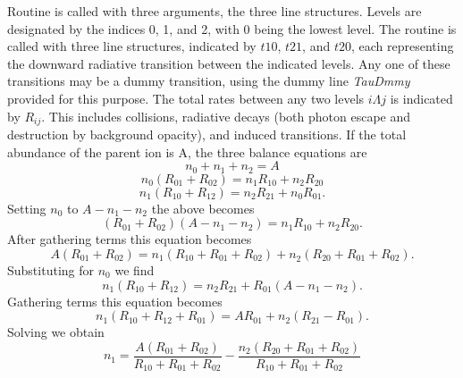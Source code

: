 Routine  is called with three arguments, the three line structures.
Levels are designated by the indices 0, 1, and 2, with 0 being the lowest
level.  The routine is called with three line structures, indicated by $t10$,
$t21$, and $t20$, each representing the downward radiative transition between
the indicated levels.  Any one of these transitions may be a dummy
transition, using the dummy line \emph{TauDmmy} provided for this purpose.  The
total rates between any two levels $i\Lambda j$ is indicated by $R_{ij}$.  This includes
collisions, radiative decays (both photon escape and destruction by
background opacity), and induced transitions.  If the total abundance of
the parent ion is A, the three balance equations are
\begin{equation}
{n_0} + {n_1} + {n_2} = A
\end{equation}
\begin{equation}
{n_0}\left( {{R_{01}} + {R_{02}}} \right) = {n_1}{R_{10}} + {n_2}{R_{20}}
\end{equation}
\begin{equation}
{n_1}\left( {{R_{10}} + {R_{12}}} \right) = {n_2}{R_{21}} + {n_0}{R_{01}}.
\end{equation}
Setting $n_0$ to $A-n_1-n_2$ the above becomes
\begin{equation}
\left( {{R_{01}} + {R_{02}}} \right)\left( {A - {n_1} - {n_2}} \right)
= {n_1}{R_{10}} + {n_2}{R_{20}}.
\end{equation}
After gathering terms this equation becomes
\begin{equation}
A\left( {{R_{01}} + {R_{02}}} \right) = {n_1}\left( {{R_{10}} + {R_{01}}
+ {R_{02}}} \right) + n_2^{}\left( {{R_{20}} + {R_{01}} + {R_{02}}} \right) .
\end{equation}
Substituting for $n_0$ we find
\begin{equation}
{n_1}\left( {{R_{10}} + {R_{12}}} \right) = {n_2}{R_{21}} + {R_{01}}\left(
{A - {n_1} - {n_2}} \right).
\end{equation}
Gathering terms this equation becomes
\begin{equation}
{n_1}\left( {{R_{10}} + {R_{12}} + {R_{01}}} \right) = A{R_{01}} +
{n_2}\left( {{R_{21}} - {R_{01}}} \right)
.
\end{equation}
Solving we obtain
\begin{equation}
{n_1} = \frac{{A\left( {{R_{01}} + {R_{02}}} \right)}}{{{R_{10}} + {R_{01}}
+ {R_{02}}}} - \frac{{{n_2}\left( {{R_{20}} + {R_{01}} + {R_{02}}}
\right)}}{{{R_{10}} + {R_{01}} + {R_{02}}}}
\end{equation}
